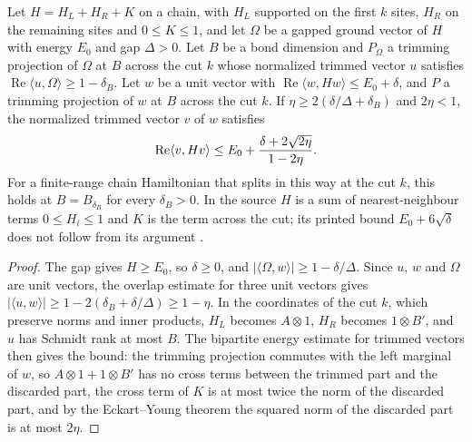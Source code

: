 \begin{lemma}
    \label{thm:chain_trim_energy}
    \leanok
    Let $H=H_L+H_R+K$ on a chain, with $H_L$ supported on the first $k$
    sites, $H_R$ on the remaining sites and $0\le K\le1$, and let $\Omega$
    be a gapped ground vector of $H$ with energy $E_0$ and gap $\Delta>0$.
    Let $B$ be a bond dimension and $P_\Omega$ a trimming projection of
    $\Omega$ at $B$ across the cut $k$ whose normalized trimmed vector $u$
    satisfies $\operatorname{Re}\langle u,\Omega\rangle\ge1-\delta_B$. Let
    $w$ be a unit vector with $\operatorname{Re}\langle w,Hw\rangle\le
        E_0+\delta$, and $P$ a trimming projection of $w$ at $B$ across the cut
    $k$. If $\eta\ge2(\delta/\Delta+\delta_B)$ and $2\eta<1$, the normalized
    trimmed vector $v$ of $w$ satisfies
    \begin{align}
        \operatorname{Re}\langle v,Hv\rangle
        \le E_0+\frac{\delta+2\sqrt{2\eta}}{1-2\eta}. \notag
    \end{align}
    For a finite-range chain Hamiltonian that splits in this way at the cut
    $k$, this holds at $B=B_{\delta_B}$ for every $\delta_B>0$. In the
    source $H$ is a sum of nearest-neighbour terms $0\le H_i\le1$ and $K$ is
    the term across the cut; its printed bound $E_0+6\sqrt\delta$ does not
    follow from its argument \cite{gap:lvv13_trimming_energy}.
\end{lemma}
\begin{proof}\leanok
    The gap gives $H\ge E_0$, so $\delta\ge0$, and
    $|\langle\Omega,w\rangle|\ge1-\delta/\Delta$. Since $u$, $w$ and $\Omega$
    are unit vectors, the overlap estimate for three unit vectors gives
    $|\langle u,w\rangle|\ge1-2(\delta_B+\delta/\Delta)\ge1-\eta$. In the
    coordinates of the cut $k$, which preserve norms and inner products,
    $H_L$ becomes $A\otimes1$, $H_R$ becomes $1\otimes B'$, and $u$ has
    Schmidt rank at most $B$. The bipartite energy estimate for trimmed
    vectors then gives the bound: the trimming projection commutes with the
    left marginal of $w$, so $A\otimes1+1\otimes B'$ has no cross terms
    between the trimmed part and the discarded part, the cross term of $K$ is
    at most twice the norm of the discarded part, and by the Eckart--Young
    theorem the squared norm of the discarded part is at most $2\eta$.
\end{proof}

